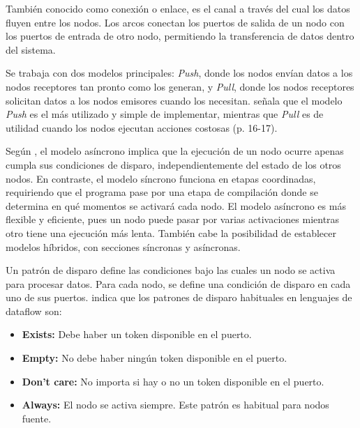 
También conocido como conexión o enlace, es el canal a través del cual los datos fluyen entre los nodos. Los arcos conectan los puertos de salida de un nodo con los puertos de entrada de otro nodo, permitiendo la transferencia de datos dentro del sistema.


Se trabaja con dos modelos principales: \emph{Push}, donde los nodos envían datos a los nodos receptores tan pronto como los generan, y \emph{Pull}, donde los nodos receptores solicitan datos a los nodos emisores cuando los necesitan.  señala que el modelo \emph{Push} es el más utilizado y simple de implementar, mientras que \emph{Pull} es de utilidad cuando los nodos ejecutan acciones costosas (p. 16-17).


Según , el modelo asíncrono implica que la ejecución de un nodo ocurre apenas cumpla sus condiciones de disparo, independientemente del estado de los otros nodos. En contraste, el modelo síncrono funciona en etapas coordinadas, requiriendo que el programa pase por una etapa de compilación donde se determina en qué momentos se activará cada nodo. El modelo asíncrono es más flexible y eficiente, pues un nodo puede pasar por varias activaciones mientras otro tiene una ejecución más lenta. También cabe la posibilidad de establecer modelos híbridos, con secciones síncronas y asíncronas.


Un patrón de disparo define las condiciones bajo las cuales un nodo se activa para procesar datos. Para cada nodo, se define una condición de disparo en cada uno de sus puertos.  indica que los patrones de disparo habituales en lenguajes de dataflow son:

\begin{itemize}
    \item \textbf{Exists:} Debe haber un token disponible en el puerto.
    \item \textbf{Empty:} No debe haber ningún token disponible en el puerto.
    \item \textbf{Don't care:} No importa si hay o no un token disponible en el puerto.
    \item \textbf{Always:} El nodo se activa siempre. Este patrón es habitual para nodos fuente.
\end{itemize}

